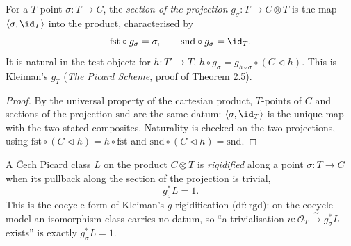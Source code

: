 \begin{definition}
  \label{def:sectionOfPoint}
  \leanok
  For a \(T\)-point \(\sigma \colon T \to C\), the \emph{section of the projection}
  \(g_\sigma \colon T \to C \otimes T\) is the map \(\langle \sigma, \id_T \rangle\) into the
  product, characterised by
  \[
    \mathrm{fst} \circ g_\sigma = \sigma, \qquad \mathrm{snd} \circ g_\sigma = \id_T .
  \]
  It is natural in the test object: for \(h \colon T' \to T\), \(h \circ g_\sigma = g_{h \circ
  \sigma} \circ (C \lhd h)\). This is Kleiman's \(g_T\) (\emph{The Picard Scheme}, proof of
  Theorem 2.5).
\end{definition}
\begin{proof}
  \leanok
  By the universal property of the cartesian product, \(T\)-points of \(C\) and sections of the
  projection \(\mathrm{snd}\) are the same datum: \(\langle \sigma, \id_T\rangle\) is the unique
  map with the two stated composites. Naturality is checked on the two projections, using
  \(\mathrm{fst} \circ (C \lhd h) = h \circ \mathrm{fst}\) and \(\mathrm{snd} \circ (C \lhd h) =
  \mathrm{snd}\).
\end{proof}

\begin{definition}
  \label{def:isRigidified}
  \leanok
  A \v Cech Picard class \(L\) on the product \(C \otimes T\) is \emph{rigidified} along a point
  \(\sigma \colon T \to C\) when its pullback along the section of the projection is trivial,
  \[
    g_\sigma^{*} L = 1 .
  \]
  This is the cocycle form of Kleiman's \(g\)-rigidification (\(\mathrm{df:rgd}\)): on the
  cocycle model an isomorphism class carries no datum, so ``a trivialisation \(u \colon
  \mathcal O_T \xrightarrow{\ \sim\ } g_\sigma^{*} L\) exists'' is exactly \(g_\sigma^{*} L = 1\).
\end{definition}

